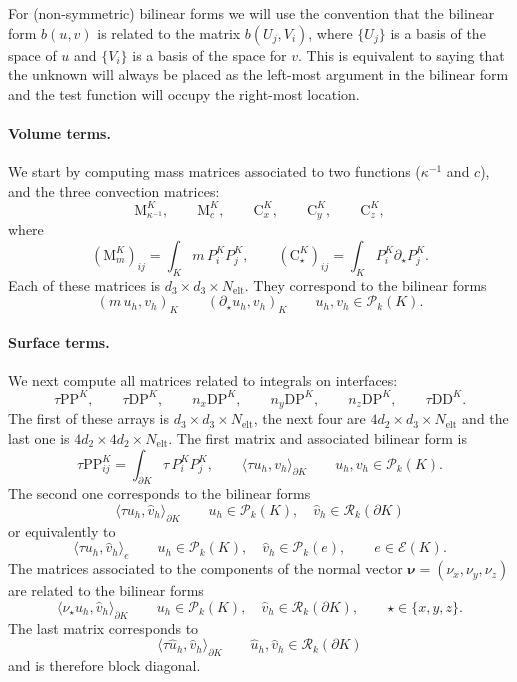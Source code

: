 \documentclass[10pt,english]{article}
\newcommand{\Nelt}{{N_{\mathrm{elt}}}}
\begin{document}
For (non-symmetric) bilinear forms we will use the convention that the bilinear form $b(u,v)$ is related to the matrix $b(U_j,V_i)$, where $\{U_j\}$ is a basis of the space of $u$ and $\{V_i\}$ is a basis of the space for $v$. This is equivalent to saying that the unknown will always be placed as the left-most argument in the bilinear form and the test function will occupy the right-most location.


\paragraph{Volume terms.} We start by computing mass matrices associated to two functions ($\kappa^{-1}$ and $c$), and the three convection matrices:
\[
\mathrm M_{\kappa^{-1}}^K, \qquad \mathrm M_c^K, \qquad \mathrm C_x^K, \qquad \mathrm C_y^K, \qquad \mathrm C_z^K,
\]
where
\[
(\mathrm M_m^K)_{ij}=\int_K m\, P_i^K P_j^K, \qquad (\mathrm C_\star^K)_{ij}=\int_K P_i^K \partial_{\star} P_j^K.
\]
Each of these matrices is $d_3\times d_3\times \Nelt$. They correspond to the bilinear forms
\[
(m\,u_h,v_h)_K \qquad (\partial_{\star} u_h,v_h)_K \qquad u_h, v_h \in \mathcal P_k(K).
\]

\paragraph{Surface terms.} We next compute all matrices related to integrals on interfaces:
\[
\tau\mathrm{PP}^K, \qquad \tau\mathrm{DP}^K,  \qquad n_x\mathrm{DP}^K, \qquad n_y\mathrm{DP}^K, \qquad n_z\mathrm{DP}^K,\qquad \tau\mathrm{DD}^K.
\]
The first of these arrays is $d_3\times d_3\times \Nelt$, the next four are $4d_2\times d_3\times \Nelt$ and the last one is $4d_2\times 4d_2\times \Nelt$. The first matrix and associated bilinear form is
\[
\tau\mathrm{PP}^K_{ij} =\int_{\partial K} \tau\, P_i^K P_j^K, \qquad \langle \tau u_h,v_h\rangle_{\partial K} \qquad u_h,v_h \in \mathcal P_k(K).
\]
The second one corresponds to the bilinear forms
\[
\langle \tau u_h,\widehat v_h\rangle_{\partial K} \qquad u_h\in \mathcal P_k(K), \quad \widehat v_h \in \mathcal R_k(\partial K)
\]
or equivalently to
\[
\langle \tau u_h,\widehat v_h\rangle_e  \qquad u_h\in \mathcal P_k(K), \quad \widehat v_h \in \mathcal P_k(e), \qquad e \in \mathcal E(K).
\]
The matrices associated to the components of the normal vector $\boldsymbol\nu=(\nu_x,\nu_y,\nu_z)$ are related to the bilinear forms
\[
\langle \nu_\star u_h,\widehat v_h\rangle_{\partial K} \qquad u_h\in \mathcal P_k(K), \quad \widehat v_h \in \mathcal R_k(\partial K), \qquad \star\in \{x,y,z\}.
\]
The last matrix corresponds to
\[
\langle \tau \widehat u_h,\widehat v_h\rangle_{\partial K} \qquad \widehat u_h,\widehat v_h \in \mathcal R_k(\partial K)
\]
and is therefore block diagonal.
\end{document}
